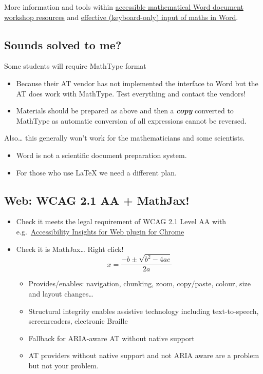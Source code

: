 \documentclass[
  12pt,
  a4paper]{extarticle}
\providecommand{\tightlist}{%
  \setlength{\itemsep}{0pt}\setlength{\parskip}{0pt}}
\renewcommand{\;}{\,}
\begin{document}
More information and tools within \href{https://stem-enable.github.io/WordWorkshop/}{accessible mathematical Word document workshop resources} and \href{https://bathmash.github.io/gettingstarted/Word/index.html}{effective (keyboard-only) input of maths in Word}.

\hypertarget{sounds-solved-to-me}{%
\subsection{Sounds solved to me?}\label{sounds-solved-to-me}}

Some students will require MathType format

\begin{itemize}
\tightlist
\item
  Because their AT vendor has not implemented the interface to Word but the AT does work with MathType. Test everything and contact the vendors!
\item
  Materials should be prepared as above and then a \textbf{\emph{copy}} converted to MathType as automatic conversion of all expressions cannot be reversed.
\end{itemize}

Also\ldots{} this generally won't work for the mathematicians and some scientists.

\begin{itemize}
\tightlist
\item
  Word is not a scientific document preparation system.
\item
  For those who use LaTeX we need a different plan.
\end{itemize}

\hypertarget{web-wcag-2.1-aa-mathjax}{%
\subsection{Web: WCAG 2.1 AA + MathJax!}\label{web-wcag-2.1-aa-mathjax}}

\begin{itemize}
\item
  Check it meets the legal requirement of WCAG 2.1 Level AA with e.g.~\href{https://accessibilityinsights.io/docs/en/web/overview}{Accessibility Insights for Web plugin for Chrome}
\item
  Check it is MathJax\ldots{} Right click!
  \[x = \frac{-b\pm\sqrt{b^2 - 4ac}}{2a}\]

  \begin{itemize}
  \tightlist
  \item
    Provides/enables: navigation, chunking, zoom, copy/paste, colour, size and layout changes\ldots{}
  \item
    Structural integrity enables assistive technology including text-to-speech, screenreaders, electronic Braille
  \item
    Fallback for ARIA-aware AT without native support
  \item
    AT providers without native support and not ARIA aware are a problem but not your problem.
  \end{itemize}
\end{itemize}
\end{document}
